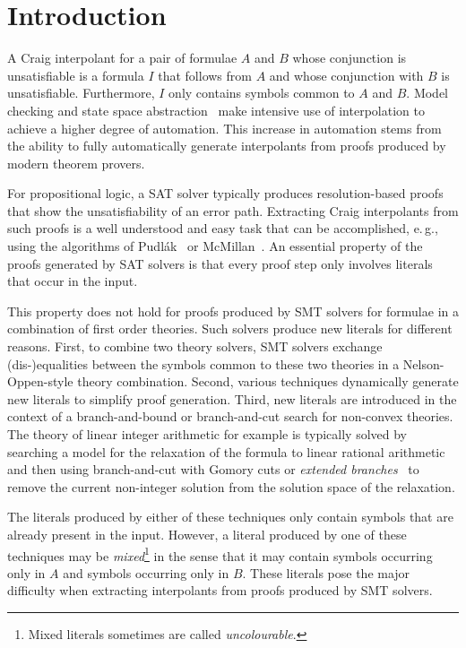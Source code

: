\section{Introduction}

A Craig interpolant for a pair of formulae $A$ and $B$ whose conjunction is
unsatisfiable is a formula $I$ that follows from $A$ and whose conjunction
with $B$ is unsatisfiable.  Furthermore, $I$ only contains symbols common
to $A$ and $B$. Model checking and state space abstraction~\cite{henzinger04afp,mcmillan06lai} make
intensive use of interpolation to achieve a higher degree of automation. This
increase in automation stems from the ability to fully automatically generate
interpolants from proofs produced by modern theorem provers. 

For propositional logic, a SAT solver typically produces resolution-based
proofs that show the unsatisfiability of an error path.
Extracting Craig interpolants from such
proofs is a well understood and easy task that can be accomplished, e.\,g.,
using the algorithms of Pudl\'ak~\cite{DBLP:journals/jsyml/Pudlak97} or
McMillan~\cite{DBLP:conf/tacas/McMillan04}.  An essential property of
the proofs generated by SAT solvers is that every proof step only involves
literals that occur in the input.

This property does not hold for proofs produced by SMT solvers for formulae
in a combination of first order theories.  Such solvers produce new literals
for different reasons.  First, to combine two theory solvers, SMT solvers
exchange (dis-)equalities between the symbols common to these two theories in
a Nelson-Oppen-style theory combination.
Second, various techniques dynamically generate new literals to simplify proof
generation. Third, new literals are introduced in the context of a
branch-and-bound or branch-and-cut search for non-convex theories. The
theory of linear integer arithmetic for example is typically solved by
searching a model for the relaxation of the formula to linear rational arithmetic
and then using branch-and-cut with Gomory cuts or \emph{extended
  branches}~\cite{Dillig2011} to remove the current non-integer solution 
from the solution space of the relaxation.

The literals produced by either of these techniques only contain symbols that are already present in the input.  However, a
literal produced by one of these techniques may be \emph{mixed}\footnote{Mixed
  literals sometimes are called \emph{uncolourable}.} in the sense that it may
contain symbols occurring only in $A$ and symbols occurring only in $B$.
These
literals pose the major difficulty when extracting interpolants from proofs
produced by SMT solvers.


